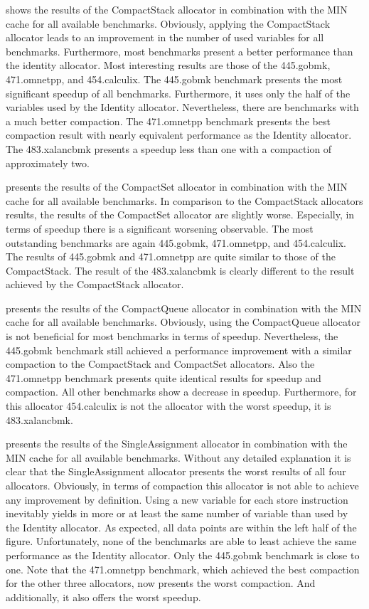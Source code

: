\documentclass[onecolumn, openright, master, english, signatures]{dbrgrptt}
\begin{document}
 shows the results of the CompactStack allocator in combination with the \ac{MIN} cache for all available benchmarks.
Obviously, applying the CompactStack allocator leads to an improvement in the number of used variables for all benchmarks.
Furthermore, most benchmarks present a better performance than the identity allocator.
Most interesting results are those of the 445.gobmk, 471.omnetpp, and 454.calculix.
The 445.gobmk benchmark presents the most significant speedup of all benchmarks.
Furthermore, it uses only the half of the variables used by the Identity allocator.
Nevertheless, there are benchmarks with a much better compaction.
The 471.omnetpp benchmark presents the best compaction result with nearly equivalent performance as the Identity allocator.
The 483.xalancbmk presents a speedup less than one with a compaction of approximately two.

 presents the results of the CompactSet allocator in combination with the \ac{MIN} cache for all available benchmarks.
In comparison to the CompactStack allocators results, the results of the CompactSet allocator are slightly worse.
Especially, in terms of speedup there is a significant worsening observable.
The most outstanding benchmarks are again 445.gobmk, 471.omnetpp, and 454.calculix.
The results of 445.gobmk and 471.omnetpp are quite similar to those of the CompactStack.
The result of the 483.xalancbmk is clearly different to the result achieved by the CompactStack allocator.

 presents the results of the CompactQueue allocator in combination with the \ac{MIN} cache for all available benchmarks.
Obviously, using the CompactQueue allocator is not beneficial for most benchmarks in terms of speedup.
Nevertheless, the 445.gobmk benchmark still achieved a performance improvement with a similar compaction to the CompactStack and CompactSet allocators.
Also the 471.omnetpp benchmark presents quite identical results for speedup and compaction.
All other benchmarks show a decrease in speedup.
Furthermore, for this allocator 454.calculix is not the allocator with the worst speedup, it is 483.xalancbmk.

 presents the results of the SingleAssignment allocator in combination with the \ac{MIN} cache for all available benchmarks.
Without any detailed explanation it is clear that the SingleAssignment allocator presents the worst results of all four allocators.
Obviously, in terms of compaction this allocator is not able to achieve any improvement by definition.
Using a new variable for each store instruction inevitably yields in more or at least the same number of variable than used by the Identity allocator.
As expected, all data points are within the left half of the figure.
Unfortunately, none of the benchmarks are able to least achieve the same performance as the Identity allocator.
Only the 445.gobmk benchmark is close to one.
Note that the 471.omnetpp benchmark, which achieved the best compaction for the other three allocators, now presents the worst compaction.
And additionally, it also offers the worst speedup.
\end{document}
